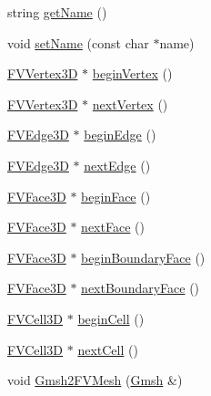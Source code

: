 \begin{DoxyCompactItemize}
string \hyperlink{classFVMesh3D_a11335e13e50af74108bf926dc1340b4b}{getName} ()
\item 
void \hyperlink{classFVMesh3D_ab3a256e7d9fad73fa57de7c1fedf51c5}{setName} (const char $\ast$name)
\item 
\hyperlink{classFVVertex3D}{FVVertex3D} $\ast$ \hyperlink{classFVMesh3D_a00e03dd7e67cf78d0d00487e52394451}{beginVertex} ()
\item 
\hyperlink{classFVVertex3D}{FVVertex3D} $\ast$ \hyperlink{classFVMesh3D_a936762a7544b61fc2a7bf156a3394d28}{nextVertex} ()
\item 
\hyperlink{classFVEdge3D}{FVEdge3D} $\ast$ \hyperlink{classFVMesh3D_aa5375d5ffa663cdd69ade5bc63928201}{beginEdge} ()
\item 
\hyperlink{classFVEdge3D}{FVEdge3D} $\ast$ \hyperlink{classFVMesh3D_a67d59b9d682de14593cbd6c930acaaef}{nextEdge} ()
\item 
\hyperlink{classFVFace3D}{FVFace3D} $\ast$ \hyperlink{classFVMesh3D_aa21193e45097be75beb98132a1586e58}{beginFace} ()
\item 
\hyperlink{classFVFace3D}{FVFace3D} $\ast$ \hyperlink{classFVMesh3D_aa3011d7de736306ee0ab315acfcb73a7}{nextFace} ()
\item 
\hyperlink{classFVFace3D}{FVFace3D} $\ast$ \hyperlink{classFVMesh3D_a8e94853226f20fd1d94c53993921b94b}{beginBoundaryFace} ()
\item 
\hyperlink{classFVFace3D}{FVFace3D} $\ast$ \hyperlink{classFVMesh3D_ac42363a65430e5b4b2037c32bca3aa11}{nextBoundaryFace} ()
\item 
\hyperlink{classFVCell3D}{FVCell3D} $\ast$ \hyperlink{classFVMesh3D_afedea325600782baa66ee59f2a2898db}{beginCell} ()
\item 
\hyperlink{classFVCell3D}{FVCell3D} $\ast$ \hyperlink{classFVMesh3D_a1b650a928d500886c73dc65f4f5e67cf}{nextCell} ()
\item 
void \hyperlink{classFVMesh3D_a0e92c55aa6380dc0f928e8dbc43ebe49}{Gmsh2FVMesh} (\hyperlink{classGmsh}{Gmsh} \&)
\end{DoxyCompactItemize}


